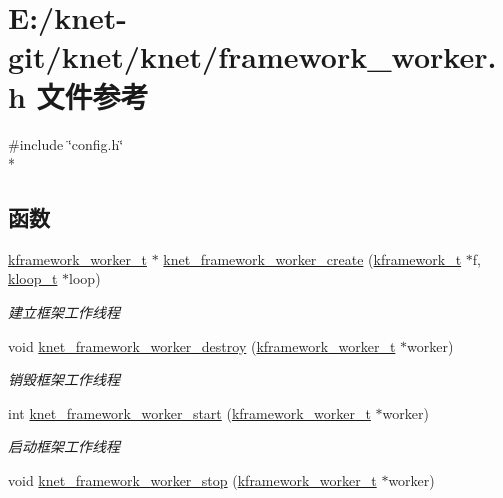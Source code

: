 \hypertarget{a00064}{}\section{E\+:/knet-\/git/knet/knet/framework\+\_\+worker.h 文件参考}
\label{a00064}
{\ttfamily \#include \char`\"{}config.\+h\char`\"{}}\\*
\subsection*{函数}
\begin{DoxyCompactItemize}
\item 
\hyperlink{a00054_af2a7f5b8406de73682f8bd4c2afee783_af2a7f5b8406de73682f8bd4c2afee783}{kframework\+\_\+worker\+\_\+t} $\ast$ \hyperlink{a00064_a032b3c34db5de1a62a8bcf5ca9ebe1f8_a032b3c34db5de1a62a8bcf5ca9ebe1f8}{knet\+\_\+framework\+\_\+worker\+\_\+create} (\hyperlink{a00054_a3195a3be35782fc1efb920c811be111d_a3195a3be35782fc1efb920c811be111d}{kframework\+\_\+t} $\ast$f, \hyperlink{a00054_a97fc76209a58362019f1ded9169e397f_a97fc76209a58362019f1ded9169e397f}{kloop\+\_\+t} $\ast$loop)
\begin{DoxyCompactList}\small\item\em 建立框架工作线程 \end{DoxyCompactList}\item 
void \hyperlink{a00064_a062cc63d020aca69e4434f95ffe8403c_a062cc63d020aca69e4434f95ffe8403c}{knet\+\_\+framework\+\_\+worker\+\_\+destroy} (\hyperlink{a00054_af2a7f5b8406de73682f8bd4c2afee783_af2a7f5b8406de73682f8bd4c2afee783}{kframework\+\_\+worker\+\_\+t} $\ast$worker)
\begin{DoxyCompactList}\small\item\em 销毁框架工作线程 \end{DoxyCompactList}\item 
int \hyperlink{a00064_aeb6f9a3c96da0c33695534a460e8f756_aeb6f9a3c96da0c33695534a460e8f756}{knet\+\_\+framework\+\_\+worker\+\_\+start} (\hyperlink{a00054_af2a7f5b8406de73682f8bd4c2afee783_af2a7f5b8406de73682f8bd4c2afee783}{kframework\+\_\+worker\+\_\+t} $\ast$worker)
\begin{DoxyCompactList}\small\item\em 启动框架工作线程 \end{DoxyCompactList}\item 
void \hyperlink{a00064_a6465eaddfbf6bfa8c7d54b489eb43462_a6465eaddfbf6bfa8c7d54b489eb43462}{knet\+\_\+framework\+\_\+worker\+\_\+stop} (\hyperlink{a00054_af2a7f5b8406de73682f8bd4c2afee783_af2a7f5b8406de73682f8bd4c2afee783}{kframework\+\_\+worker\+\_\+t} $\ast$worker)

\end{DoxyCompactItemize}
